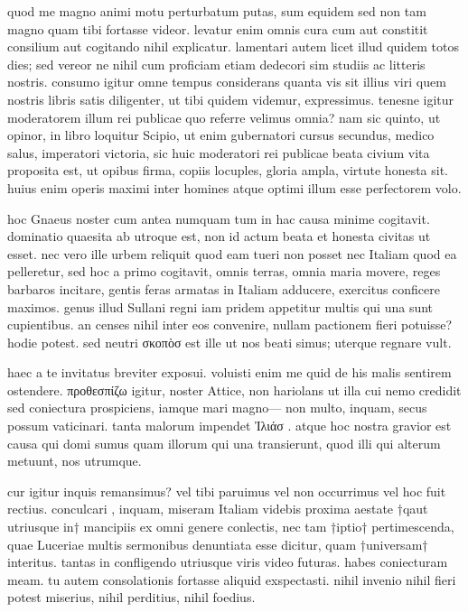 


 quod me magno animi motu perturbatum putas, sum equidem sed non tam magno quam tibi fortasse videor. levatur enim omnis cura cum aut constitit consilium aut cogitando nihil explicatur. lamentari autem licet illud quidem totos dies; sed vereor ne nihil cum proficiam etiam dedecori sim studiis ac litteris nostris. consumo igitur omne tempus considerans quanta vis sit illius viri quem nostris libris satis diligenter, ut tibi quidem videmur, expressimus. tenesne igitur moderatorem illum rei publicae quo referre velimus omnia? nam sic quinto, ut opinor, in libro loquitur Scipio, ut enim gubernatori cursus secundus, medico salus, imperatori victoria, sic huic moderatori rei publicae beata civium vita proposita est, ut opibus firma, copiis locuples, gloria ampla, virtute honesta sit. huius enim operis maximi inter homines atque optimi illum esse perfectorem volo.

 hoc Gnaeus noster cum antea numquam tum in hac causa minime cogitavit. dominatio quaesita ab utroque est, non id actum beata et honesta civitas ut esset. nec vero ille urbem reliquit quod eam tueri non posset nec Italiam quod ea pelleretur, sed hoc a primo cogitavit, omnis terras, omnia maria movere, reges barbaros incitare, gentis feras armatas in Italiam adducere, exercitus conficere maximos. genus illud Sullani regni iam pridem appetitur multis qui una sunt cupientibus. an censes nihil inter eos convenire, nullam pactionem fieri potuisse? hodie potest. sed neutri σκοπὸσ est ille ut nos beati simus; uterque regnare vult.

 haec a te invitatus breviter exposui. voluisti enim me quid de his malis sentirem ostendere. προθεσπίζω igitur, noster Attice, non hariolans ut illa cui nemo credidit sed coniectura prospiciens, iamque mari magno— non multo, inquam, secus possum vaticinari. tanta malorum impendet Ἰλιάσ . atque hoc nostra gravior est causa qui domi sumus quam illorum qui una transierunt, quod illi qui alterum metuunt, nos utrumque.

 cur igitur inquis remansimus? vel tibi paruimus vel non occurrimus vel hoc fuit rectius. conculcari , inquam, miseram Italiam videbis proxima aestate †qaut utriusque in† mancipiis ex omni genere conlectis, nec tam †iptio† pertimescenda, quae Luceriae multis sermonibus denuntiata esse dicitur, quam †universam† interitus. tantas in confligendo utriusque viris video futuras. habes coniecturam meam. tu autem consolationis fortasse aliquid exspectasti. nihil invenio nihil fieri potest miserius, nihil perditius, nihil foedius.

